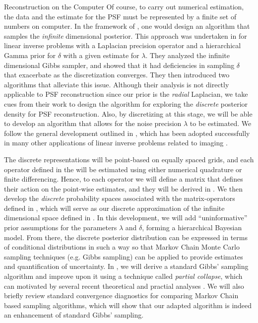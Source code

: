 \begin{chapter}{Reconstruction on the Computer}
Of course, to carry out numerical estimation, the data and the estimate for the PSF must be represented by a finite set of numbers on computer.
In the framework of \citep{stuart2010}, one would design an algorithm that samples the \emph{infinite} dimensional posterior. 
This approach was undertaken in \citep{agapiou2014analysis} for linear inverse problems with a Laplacian precision operator and a hierarchical Gamma prior for $\delta$ with a given estimate for $\lambda$. 
They analyzed the infinite dimensional Gibbs sampler, and showed that it had deficiencies in sampling $\delta$ that exacerbate as the discretization converges.
They then introduced two algorithms that alleviate this issue.
Although their analysis is not directly applicable to PSF reconstruction since our prior is the \emph{radial} Laplacian, we take cues from their work to design the algorithm for exploring the \emph{discrete} posterior density for PSF reconstruction.
Also, by discretizing at this stage, we will be able to develop an algorithm that allows for the noise precision $\lambda$ to be estimated.
We follow the general development outlined in \citep{bardsley2012mcmc}, which has been adopted successfully in many other applications of linear inverse problems related to imaging \citep{howard2016bayesian,bardsley2016metropolis,fowler2016stochastic,bardsley2015dealing,bardsley2013efficient}.

The discrete representations will be point-based on equally spaced grids, and each operator defined in the  will be estimated using either numerical quadrature or finite differencing.
Hence, to each operator we will define a matrix that defines their action on the point-wise estimates, and they will be derived in .
We then develop the \emph{discrete} probability spaces associated with the matrix-operators defined in , which will serve as our discrete approximation of the infinite dimensional space defined in .
In this development, we will add ``uninformative'' prior assumptions for the parameters $\lambda$ and $\delta$, forming a hierarchical Bayesian model.
From there, the discrete posterior distribution can be expressed in terms of conditional distributions in such a way so that Markov Chain Monte Carlo sampling techniques (e.g. Gibbs sampling) can be applied to provide estimates and quantification of uncertainty.
In , we will derive a standard Gibbs' sampling algorithm \cite{geman1984stochastic} and improve upon it using a technique called \emph{partial collapse}, which can motivated by several recent theoretical and practial analyses \citep{van2008partially,agapiou2014analysis,fox2015fast}.
We will also briefly review standard convergence diagnostics for comparing Markov Chain based sampling algorithms, which will show that our adapted algorithm is indeed an enhancement of standard Gibbs' sampling.


\end{chapter}
